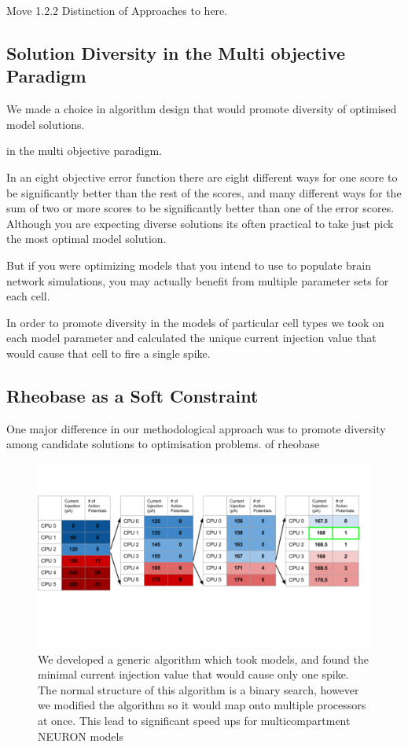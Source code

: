 
Move 1.2.2 Distinction of Approaches to here.

\subsection{Solution Diversity in the Multi objective Paradigm}


We made a choice in algorithm design that would promote diversity of optimised model solutions.

in the multi objective paradigm.

In an eight objective error function there are eight different ways for one score to be significantly better than the rest of the scores, and many different ways for the sum of two or more scores to be significantly better than one of the error scores. Although you are expecting diverse solutions its often practical to take just pick the most optimal model solution.

But if you were optimizing models that you intend to use to populate brain network simulations, you may actually benefit from multiple parameter sets for each cell.

In order to promote diversity in the models of particular cell types we took on each model parameter and calculated the unique current injection value that would cause that cell to fire a single spike. 

\subsection{Rheobase as a Soft Constraint}
One major difference in our methodological approach was to promote diversity among candidate solutions to optimisation problems. 
of rheobase 
\begin{figure}    
\begin{center}
\includegraphics[width=0.7\linewidth]{figures/rheobase_algorithm.png}
\caption{We developed a generic algorithm which took models, and found the minimal current injection value that would cause only one spike. The normal structure of this algorithm is a binary search, however we modified the algorithm so it would map onto multiple processors at once. This lead to significant speed ups for multicompartment NEURON models}

\end{center}
\end{figure}  

